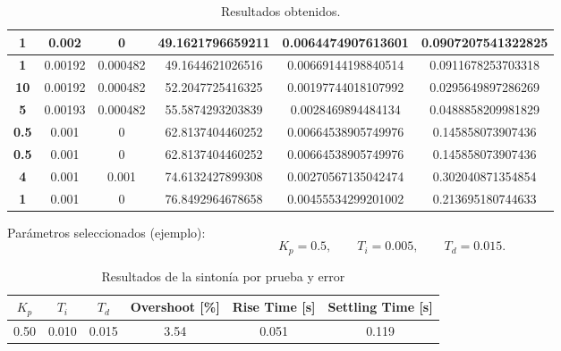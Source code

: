 \begin{table}[]
\begin{tabular}{|S|S|S|S|S|S|}
		\textbf{1}    & 0.002   & 0           & 49.1621796659211   & 0.0064474907613601   & 0.0907207541322825    \\ \hline
		\textbf{1}    & 0.00192 & 0.000482    & 49.1644621026516   & 0.00669144198840514  & 0.0911678253703318    \\ \hline
		\textbf{10}   & 0.00192 & 0.000482    & 52.2047725416325   & 0.00197744018107992  & 0.0295649897286269    \\ \hline
		\textbf{5}    & 0.00193 & 0.000482    & 55.5874293203839   & 0.0028469894484134   & 0.0488858209981829    \\ \hline
		\textbf{0.5}  & 0.001   & 0           & 62.8137404460252   & 0.00664538905749976  & 0.145858073907436     \\ \hline
		\textbf{0.5}  & 0.001   & 0           & 62.8137404460252   & 0.00664538905749976  & 0.145858073907436     \\ \hline
		\textbf{4}    & 0.001   & 0.001       & 74.6132427899308   & 0.00270567135042474  & 0.302040871354854     \\ \hline
		\textbf{1}    & 0.001   & 0           & 76.8492964678658   & 0.00455534299201002  & 0.213695180744633     \\ \hline
	\end{tabular}
	\caption{Resultados obtenidos.}
	\label{tab:versiones}
\end{table}


Parámetros seleccionados (ejemplo):
\[
K_p = 0.5,\qquad T_i = 0.005,\qquad T_d = 0.015.
\]

\begin{table}[H]
	\centering
	\small
	\caption{Resultados de la sintonía por prueba y error}
	\label{tab:pid_resultados}
	\begin{tabular}{cccccc}
		\hline
		$K_p$ & $T_i$ & $T_d$ & Overshoot [\%] & Rise Time [s] & Settling Time [s] \\
		\hline
		0.50 & 0.010 & 0.015 & 3.54 & 0.051 & 0.119 \\
		\hline
	\end{tabular}
\end{table}
